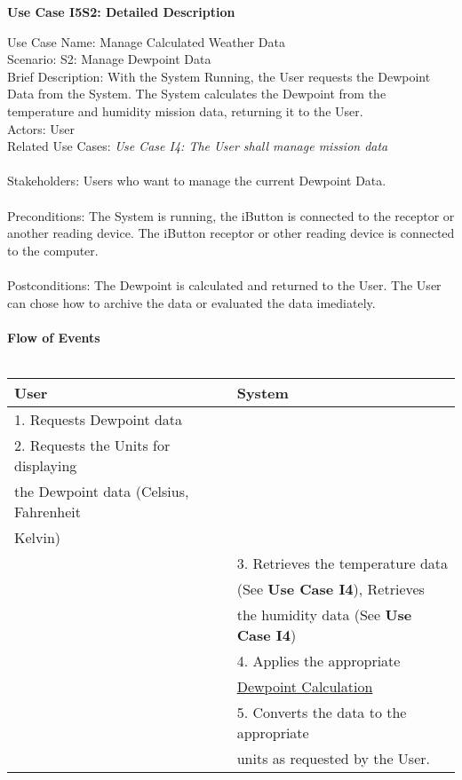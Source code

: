 \documentclass[letterpaper]{article}
\begin{document}
\noindent
\begin{center}
\textbf{Use Case I5S2:  Detailed Description}
\end{center}
Use Case Name:  Manage Calculated Weather Data\\
Scenario:  S2:  Manage Dewpoint Data\\
Brief Description:  With the System Running, the User requests the
Dewpoint Data from the System.  The System calculates the Dewpoint
from the temperature and humidity mission data, returning it to the
User.\\
Actors:  User\\
Related Use Cases: \textit{Use Case I4:  The User shall manage
mission data}\\\\
Stakeholders:  Users who want to manage the current Dewpoint Data.
\\\\
Preconditions:  The System is running, the iButton is connected to
the receptor or another reading device.  The iButton receptor or
other reading device is connected to the computer.\\\\
Postconditions:  The Dewpoint is calculated and returned to the
User.  The User can chose how to archive the data or evaluated the
data imediately.\\\\
\textbf{Flow of Events}\\\\
\begin{tabular}{|l|l|}\hline
\textbf{User} & \textbf{System}\\\hline
1.  Requests Dewpoint data & \\\hline
2.  Requests the Units for displaying & \\
the Dewpoint data (Celsius, Fahrenheit & \\
Kelvin) & \\\hline
 & 3.  Retrieves the temperature data\\
 & (See \textbf{Use Case I4}), Retrieves\\
 & the humidity data (See \textbf{Use Case I4})\\\hline
 & 4.  Applies the appropriate \\
 & \underline{Dewpoint Calculation}\\\hline
 & 5.  Converts the data to the appropriate\\
 & units as requested by the User.\\\hline
\end{tabular}\\\\
\end{document}
